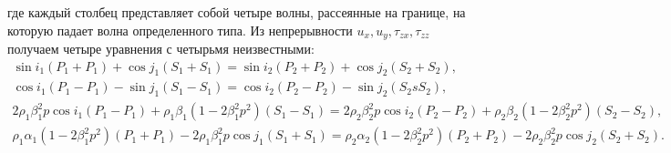 где каждый столбец представляет собой четыре волны, рассеянные на границе, на которую падает волна определенного типа. Из непрерывности $u_x, u_y, \tau_{zx}, \tau_{zz}$ получаем четыре уравнения с четырьмя неизвестными:
\begin{eqnarray}
\sin{i_1(P_1 + P_1)} + \cos{j_1(S_1 + S_1)} = \sin{i_2(P_2 + P_2)} + \cos{j_2(S_2 + S_2)}, \\
\cos{i_1(P_1 - P_1)} - \sin{j_1(S_1 - S_1)} = \cos{i_2(P_2 - P_2)} - \sin{j_2(S_2 s S_2)}, \\
2 \rho_1 \beta_1^2 p \cos{i_1(P_1 - P_1)} + \rho_1 \beta_1 (1 - 2 \beta_1^2 p^2) (S_1 - S_1) = 2 \rho_2 \beta_2^2 p \cos{i_2(P_2 - P_2)} + \rho_2 \beta_2 (1 - 2 \beta_2^2 p^2) (S_2 - S_2), \\
\rho_1 \alpha_1 (1 - 2 \beta_1^2 p^2) (P_1 + P_1) - 2 \rho_1 \beta_1^2 p \cos{j_1(S_1 + S_1)} = \rho_2 \alpha_2 (1 - 2 \beta_2^2 p^2) (P_2 + P_2) - 2 \rho_2 \beta_2^2 p \cos{j_2(S_2 + S_2)}.
\end{eqnarray}

